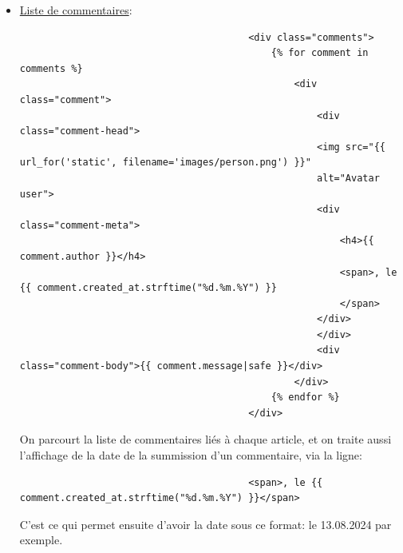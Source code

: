 \documentclass[a4paper,11pt]{article}
\begin{document}
\begin{enumerate}
\begin{itemize}
                            \item \underline{Liste de commentaires}: 
                                \begin{tcolorbox}[colback=lightgray!6, colframe=black, left=-78mm, right=5mm, top=2mm, bottom=0mm, boxrule=0.1mm]
                                    \begin{verbatim}
                                        <div class="comments">
                                            {% for comment in comments %}
                                                <div class="comment">
                                                    <div class="comment-head">
                                                    <img src="{{ url_for('static', filename='images/person.png') }}" 
                                                    alt="Avatar user">
                                                    <div class="comment-meta">
                                                        <h4>{{ comment.author }}</h4>
                                                        <span>, le {{ comment.created_at.strftime("%d.%m.%Y") }}
                                                        </span>
                                                    </div>
                                                    </div>
                                                    <div class="comment-body">{{ comment.message|safe }}</div>
                                                </div>
                                            {% endfor %}
                                        </div>
                                    \end{verbatim}
                                \end{tcolorbox}
                                \noindent On parcourt la liste de commentaires liés à chaque article, et on traite aussi l'affichage de la 
                                date de la summission d'un commentaire, via la ligne: 
                                \begin{tcolorbox}[colback=lightgray!6, colframe=black, left=-78mm, right=5mm, top=2mm, bottom=0mm, boxrule=0.1mm]
                                    \begin{verbatim}
                                        <span>, le {{ comment.created_at.strftime("%d.%m.%Y") }}</span>
                                    \end{verbatim}
                                \end{tcolorbox}

                                \noindent C'est ce qui permet ensuite d'avoir la date sous ce format:  le 13.08.2024 par exemple. 
                        \end{itemize}    
                \end{enumerate}
\end{document}
